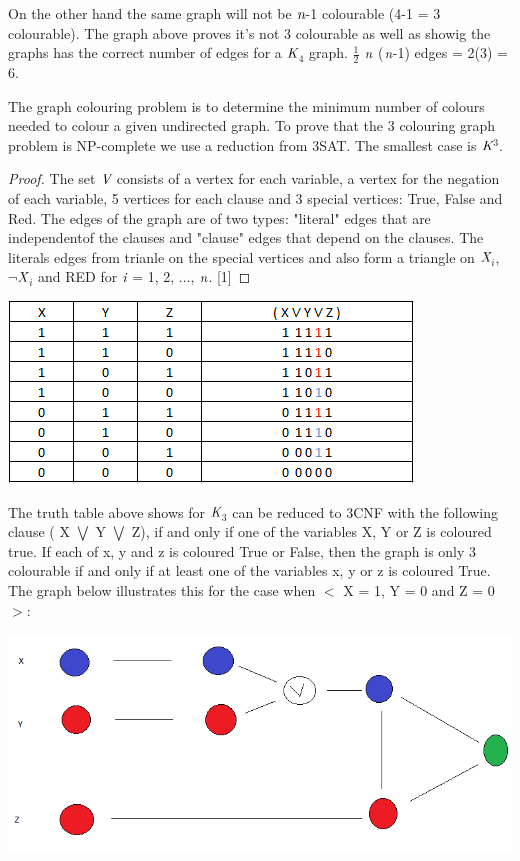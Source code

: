 \documentclass[a4paper]{report}
\newtheorem{proof}{Proof}
\begin{document}
\vspace{3mm}
On the other hand the same graph will not be $\emph{n}$-1 colourable (4-1 = 3 colourable). The graph above proves it's not 3 colourable as well as showig the graphs has the correct number of edges for a $\emph{K}$$_{4}$ graph. $\frac{1}{2}$ $\emph{n}$ ($\emph{n}$-1) edges = 2(3) = 6.

\vspace{3mm}

The graph colouring problem is to determine the minimum number of colours needed to colour a given undirected graph. To prove that the 3 colouring graph problem is NP-complete we use a reduction from 3SAT. The smallest case is $\emph{K}$$^{3}$. 

\begin{proof}
The set $\emph{V}$ consists of a vertex for each variable, a vertex for the negation of each variable, 5 vertices for each clause and 3 special vertices: True, False and Red. The edges of the graph are of two types: "literal" edges that are independentof the clauses and "clause" edges that depend on the clauses. The literals edges from trianle on the special vertices and also form a triangle on $\emph{X}$$_{i}$, $\neg$$\emph{X}$$_{i}$ and RED for $\emph{i}$ = 1, 2, ..., $\emph{n}$. [1] 
\end{proof}

\begin{center}
\includegraphics[scale=0.60]{truthtable2.png}
\end{center}

The truth table above shows for $\emph{K}$$_{3}$ can be reduced to 3CNF with the following clause ( X $\bigvee$ Y $\bigvee$ Z), if and only if one of the variables X, Y or Z is coloured true. If each of x, y and z is coloured True or False, then the graph is only 3 colourable if and only if at least one of the variables x, y or z is coloured True. The graph below illustrates this for the case when $<$ X = 1, Y = 0 and Z = 0 $>$:

\begin{center}
\includegraphics[scale=0.60]{graph1.png}
\end{center}
\end{document}
